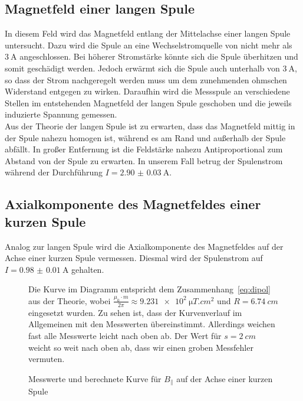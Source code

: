 \subsection{Magnetfeld einer langen Spule}
In diesem Feld wird das Magnetfeld entlang der Mittelachse einer langen Spule untersucht. Dazu wird die Spule an eine Wechselstromquelle von nicht mehr als $ \SI{3}{\ampere} $ angeschlossen. Bei höherer Stromstärke könnte sich die Spule überhitzen und somit geschädigt werden. Jedoch erwärmt sich die Spule auch unterhalb von $ \SI{3}{\ampere} $, so dass der Strom nachgeregelt werden muss um dem zunehmenden ohmschen Widerstand entgegen zu wirken. Daraufhin wird die Messspule an verschiedene Stellen im entstehenden Magnetfeld der langen Spule geschoben und die jeweils induzierte Spannung gemessen. \\
Aus der Theorie der langen Spule ist zu erwarten, dass das Magnetfeld mittig in der Spule nahezu homogen ist, während es am Rand und außerhalb der Spule abfällt. In großer Entfernung ist die Feldstärke nahezu Antiproportional zum Abstand von der Spule zu erwarten.
In unserem Fall betrug der Spulenstrom während der Durchführung $ I = \SI{2.90(3)}{\ampere} $.


\subsection{Axialkomponente des Magnetfeldes einer kurzen Spule}
Analog zur langen Spule wird die Axialkomponente des Magnetfeldes auf der Achse einer kurzen Spule vermessen. Diesmal wird der Spulenstrom auf $I=\SI{0.98(1)}{\ampere}$ gehalten.

\begin{figure}[H]
\centering
{}
\caption{Messwerte und berechnete Kurve für $B_\parallel$ auf der Achse einer kurzen Spule}
\label{fig:axialaufachsekurz}

Die Kurve im Diagramm entspricht dem Zusammenhang~\cref{eq:dipol} aus der Theorie, wobei $\frac{\mu_0\cdot m}{2\pi}\approx \SI{9.231e2}{\micro T.cm^2}$ und $R=\SI{6.74}{cm}$ eingesetzt wurden.
Zu sehen ist, dass der Kurvenverlauf im Allgemeinen mit den Messwerten übereinstimmt. Allerdings weichen fast alle Messwerte leicht nach oben ab. Der Wert für $s=\SI{2}{cm}$ weicht so weit nach oben ab, dass wir einen groben Messfehler vermuten.
\end{figure}

